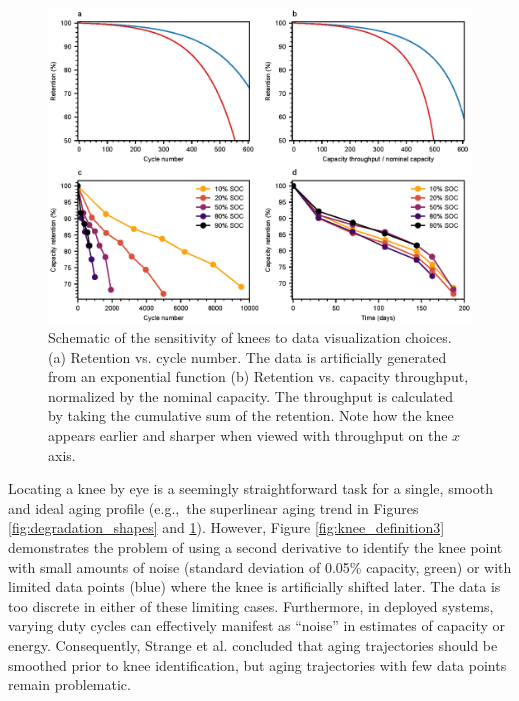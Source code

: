 \documentclass[journal=jpclcd,manuscript=article]{achemso}
\begin{document}
\begin{figure}[!ht]
\centering
\includegraphics[scale=1]{figures/x_axis_sensitivity.eps}
\caption{Schematic of the sensitivity of knees to data visualization choices.
(a) Retention vs. cycle number. The data is artificially generated from an exponential function
(b) Retention vs. capacity throughput, normalized by the nominal capacity. The throughput is calculated by taking the cumulative sum of the retention.
Note how the knee appears earlier and sharper when viewed with throughput on the $x$ axis.}
\label{fig:x_axis}
\end{figure}

Locating a knee by eye is a seemingly straightforward task for a single, smooth and ideal aging profile (e.g.,~the superlinear aging trend in Figures \ref{fig:degradation_shapes} and \ref{fig:x_axis}). However, Figure \ref{fig:knee_definition3} demonstrates the problem of using a second derivative to identify the knee point with small amounts of noise (standard deviation of 0.05\% capacity, green) or with limited data points (blue) where the knee is artificially shifted later. The data is too discrete in either of these limiting cases. Furthermore, in deployed systems, varying duty cycles can effectively manifest as ``noise'' in estimates of capacity or energy.
Consequently, Strange et al.\cite{strange_elbows_2021} concluded that aging trajectories should be smoothed prior to knee identification, but aging trajectories with few data points remain problematic.
\end{document}
